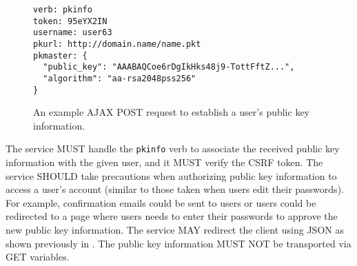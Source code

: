 \documentclass{article}
\newcommand{\todo}[1]{\textcolor{red}{#1}}
\begin{document}
\begin{figure}
\begin{lstlisting}
verb: pkinfo
token: 95eYX2IN
username: user63
pkurl: http://domain.name/name.pkt
pkmaster: {
  "public_key": "AAABAQCoe6rDgIkHks48j9-TottFftZ...",
  "algorithm": "aa-rsa2048pss256"
}
\end{lstlisting}
\caption{An example AJAX POST request to establish a user's public key information.}
\label{example:establish:pkinfo}
\end{figure}

The service MUST handle the \texttt{pkinfo} verb to associate the received public key information with the given user, and it MUST verify the CSRF token. 
The service SHOULD take precautions when authorizing public key information to access a user's account (similar to those taken when users edit their passwords). 
For example, confirmation emails could be sent to users or users could be redirected to a page where users needs to enter their passwords to approve the new public key information. 
The service MAY redirect the client using JSON as shown previously in . 
The public key information MUST NOT be transported via GET variables. 



\end{document}
